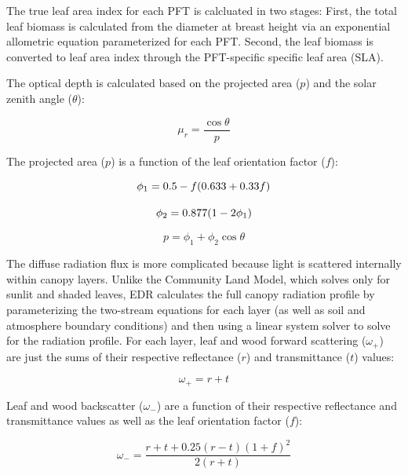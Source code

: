 The true leaf area index for each PFT is calcluated in two stages:
First, the total leaf biomass is calculated from the diameter at breast height via an exponential allometric equation parameterized for each PFT\@.
Second, the leaf biomass is converted to leaf area index through the PFT-specific specific leaf area (SLA).

The optical depth is calculated based on the projected area ($p$) and the solar zenith angle ($\theta$):

\begin{equation}
  \mu_r = \frac{\cos{\theta}}{p}
\end{equation}

The projected area ($p$) is a function of the leaf orientation factor ($f$):

\begin{equation}\label{eq:phi1}
  \phi_1 = 0.5 - f (0.633 + 0.33 f) \\
\end{equation}

\begin{equation}\label{eq:phi2}
  \phi_2 = 0.877 (1 - 2 \phi_1) \\
\end{equation}

\begin{equation}
  p = \phi_1 + \phi_2 \cos{\theta} 
\end{equation}

The diffuse radiation flux is more complicated because light is scattered internally within canopy layers.
Unlike the Community Land Model, which solves only for sunlit and shaded leaves,
EDR calculates the full canopy radiation profile by parameterizing the two-stream equations for each layer (as well as soil and atmosphere boundary conditions)
and then using a linear system solver to solve for the radiation profile.
For each layer, leaf and wood forward scattering ($\omega_+$) are just the sums of their respective reflectance ($r$) and transmittance ($t$) values:

\begin{equation}
   \omega_+ = r + t 
\end{equation}

Leaf and wood backscatter ($\omega_-$) are a function of their respective reflectance and transmittance values as well as the leaf orientation factor ($f$):

\begin{equation}\label{eq:backscatter_leaf}
   \omega_- = \frac{r + t + 0.25 (r - t) {(1 + f)} ^ 2}{2 (r + t)} 
\end{equation}

